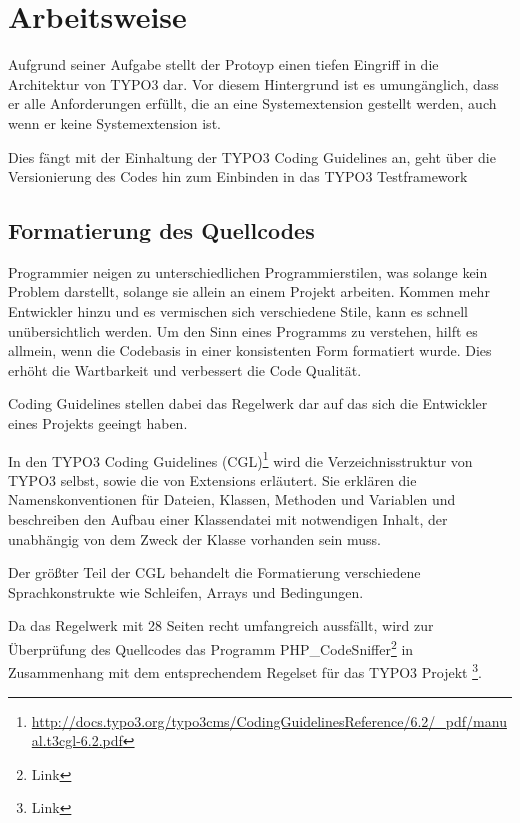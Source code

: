 \section{Arbeitsweise}
\label{sec:workstyle}
Aufgrund seiner Aufgabe stellt der Protoyp einen tiefen Eingriff in die Architektur von TYPO3 dar. Vor diesem Hintergrund ist es umungänglich, dass er alle Anforderungen erfüllt, die an eine Systemextension gestellt werden, auch wenn er keine Systemextension ist.

Dies fängt mit der Einhaltung der TYPO3 Coding Guidelines an, geht über die Versionierung des Codes hin zum Einbinden in das TYPO3 Testframework

\subsection{Formatierung des Quellcodes}
Programmier neigen zu unterschiedlichen Programmierstilen, was solange kein Problem darstellt, solange sie allein an einem Projekt arbeiten. Kommen mehr Entwickler hinzu und es vermischen sich verschiedene Stile, kann es schnell unübersichtlich werden. Um den Sinn eines Programms zu verstehen, hilft es allmein, wenn die Codebasis in einer konsistenten Form formatiert wurde. Dies erhöht die Wartbarkeit und verbessert die Code Qualität.

Coding Guidelines stellen dabei das Regelwerk dar auf das sich die Entwickler eines Projekts geeingt haben.

In den TYPO3 Coding Guidelines (CGL)\footnote{\url{http://docs.typo3.org/typo3cms/CodingGuidelinesReference/6.2/_pdf/manual.t3cgl-6.2.pdf}} wird die Verzeichnisstruktur von TYPO3 selbst, sowie die von Extensions erläutert. Sie erklären die Namenskonventionen für Dateien, Klassen, Methoden und Variablen und beschreiben den Aufbau einer Klassendatei mit notwendigen Inhalt, der unabhängig von dem Zweck der Klasse vorhanden sein muss.

Der größter Teil der CGL behandelt die Formatierung verschiedene Sprachkonstrukte wie Schleifen, Arrays und Bedingungen.

Da das Regelwerk mit 28 Seiten recht umfangreich aussfällt, wird zur Überprüfung des Quellcodes das Programm PHP\_CodeSniffer\footnote{Link} in Zusammenhang mit dem entsprechendem Regelset für das TYPO3 Projekt \footnote{Link}.

